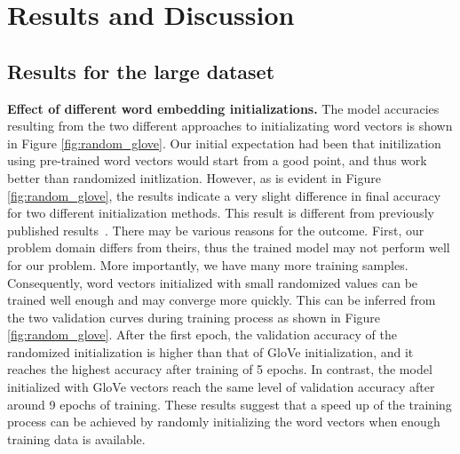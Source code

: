 \documentclass[conference,compsoc]{IEEEtran}
\begin{document}
\section{Results and Discussion}\label{sec:Results}\subsection{Results for the large dataset}\textbf{Effect of different word embedding initializations.} The model accuracies resulting from the two different approaches to initializating word vectors is shown in Figure \ref{fig:random_glove}. Our initial expectation had been that initilization using pre-trained word vectors would start from a good point, and thus work better than randomized initlization. However, as is evident in Figure \ref{fig:random_glove}, the results indicate a very slight difference in final accuracy for two different initialization methods.  This result is different from previously published results~\cite{Kim14f}. There may be various reasons for the outcome. First, our problem domain differs from theirs, thus the trained model may not perform well for our problem. More importantly, we have many more training samples. Consequently,  word vectors initialized with small randomized values can be trained well enough and may converge more quickly. This can be inferred from the two validation curves during training process as shown in Figure \ref{fig:random_glove}. After the first epoch, the validation accuracy of the randomized initialization is higher than that of GloVe initialization, and it reaches the highest accuracy after training of 5 epochs. In contrast, the model initialized with GloVe vectors reach the same level of validation accuracy after around 9 epochs of training. These results suggest that a speed up of the training process can be achieved by randomly initializing the word vectors when enough training data is available.
\end{document}
